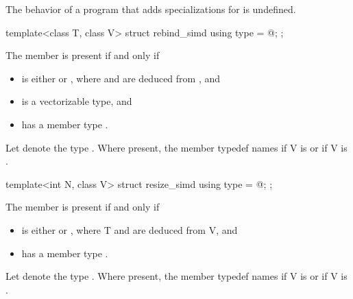 \begin{wgText}
\begin{itemdescr}
\pnum
The behavior of a program that adds specializations for  is undefined.
\end{itemdescr}

\begin{itemdecl}
template<class T, class V> struct rebind_simd { using type = @\seebelow@; };
\end{itemdecl}

\begin{itemdescr}
  \pnum
  The member  is present if and only if
  \begin{itemize}
    \item {} is either  or , where  and  are deduced from , and
    \item {} is a vectorizable type, and
    \item {} has a member type .
  \end{itemize}

  \pnum
  Let  denote the type .
  Where present, the member typedef  names
   if \tcode V is  or
   if \tcode V is .
\end{itemdescr}

\begin{itemdecl}
template<int N, class V> struct resize_simd { using type = @\seebelow@; };
\end{itemdecl}

\begin{itemdescr}
  \pnum
  The member  is present if and only if
  \begin{itemize}
    \item {} is either  or , where \tcode T and  are deduced from \tcode V, and
    \item {} has a member type .
  \end{itemize}

  \pnum
  Let  denote the type .
  Where present, the member typedef  names  if \tcode V is  or  if \tcode V is .
\end{itemdescr}


\end{wgText}

